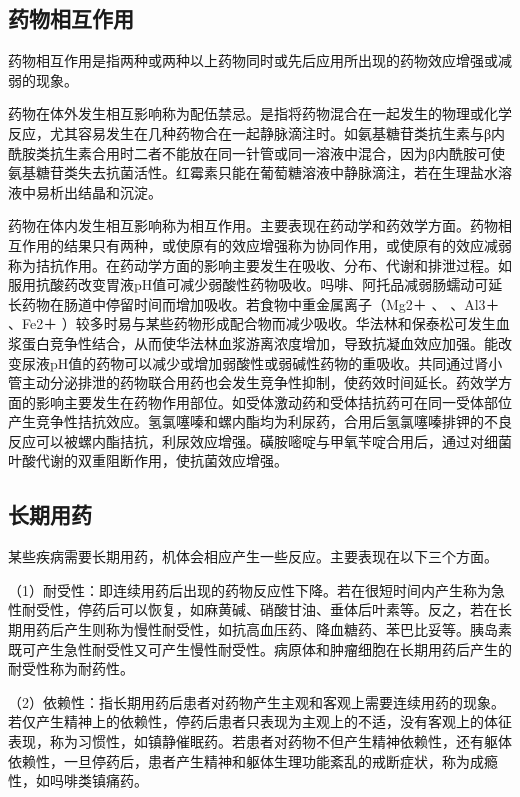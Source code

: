 \subsection{药物相互作用}

药物相互作用是指两种或两种以上药物同时或先后应用所出现的药物效应增强或减弱的现象。

药物在体外发生相互影响称为配伍禁忌。是指将药物混合在一起发生的物理或化学反应，尤其容易发生在几种药物合在一起静脉滴注时。如氨基糖苷类抗生素与β内酰胺类抗生素合用时二者不能放在同一针管或同一溶液中混合，因为β内酰胺可使氨基糖苷类失去抗菌活性。红霉素只能在葡萄糖溶液中静脉滴注，若在生理盐水溶液中易析出结晶和沉淀。

药物在体内发生相互影响称为相互作用。主要表现在药动学和药效学方面。药物相互作用的结果只有两种，或使原有的效应增强称为协同作用，或使原有的效应减弱称为拮抗作用。在药动学方面的影响主要发生在吸收、分布、代谢和排泄过程。如服用抗酸药改变胃液pH值可减少弱酸性药物吸收。吗啡、阿托品减弱肠蠕动可延长药物在肠道中停留时间而增加吸收。若食物中重金属离子（Mg{2＋}
、 、Al{3＋} 、Fe{2＋}
）较多时易与某些药物形成配合物而减少吸收。华法林和保泰松可发生血浆蛋白竞争性结合，从而使华法林血浆游离浓度增加，导致抗凝血效应加强。能改变尿液pH值的药物可以减少或增加弱酸性或弱碱性药物的重吸收。共同通过肾小管主动分泌排泄的药物联合用药也会发生竞争性抑制，使药效时间延长。药效学方面的影响主要发生在药物作用部位。如受体激动药和受体拮抗药可在同一受体部位产生竞争性拮抗效应。氢氯噻嗪和螺内酯均为利尿药，合用后氢氯噻嗪排钾的不良反应可以被螺内酯拮抗，利尿效应增强。磺胺嘧啶与甲氧苄啶合用后，通过对细菌叶酸代谢的双重阻断作用，使抗菌效应增强。

\subsection{长期用药}

某些疾病需要长期用药，机体会相应产生一些反应。主要表现在以下三个方面。

（1）耐受性：即连续用药后出现的药物反应性下降。若在很短时间内产生称为急性耐受性，停药后可以恢复，如麻黄碱、硝酸甘油、垂体后叶素等。反之，若在长期用药后产生则称为慢性耐受性，如抗高血压药、降血糖药、苯巴比妥等。胰岛素既可产生急性耐受性又可产生慢性耐受性。病原体和肿瘤细胞在长期用药后产生的耐受性称为耐药性。

（2）依赖性：指长期用药后患者对药物产生主观和客观上需要连续用药的现象。若仅产生精神上的依赖性，停药后患者只表现为主观上的不适，没有客观上的体征表现，称为习惯性，如镇静催眠药。若患者对药物不但产生精神依赖性，还有躯体依赖性，一旦停药后，患者产生精神和躯体生理功能紊乱的戒断症状，称为成瘾性，如吗啡类镇痛药。

